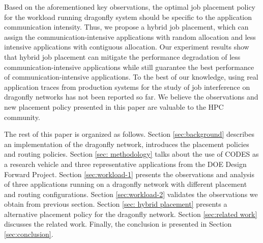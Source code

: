 Based on the aforementioned key observations, the optimal job placement policy for the workload running dragonfly system should be specific to the application communication intensity. Thus, we propose a hybrid job placement, which can assign the communication-intensive applications with random allocation and less intensive applications with contiguous allocation. Our experiment results show that hybrid job placement can mitigate the performance degradation of less communication-intensive applications while still guarantee the best performance of communication-intensive applications.
To the best of our knowledge, using real application traces from production systems for the study of job interference on dragonfly networks has not been reported so far. We believe the observations and new placement policy presented in this paper are valuable to the HPC community.


The rest of this paper is organized as follows. Section \ref{sec:background} describes an implementation of the dragonfly network, introduces the placement policies and routing policies. Section \ref{sec: methodology} talks about the use of CODES as a research vehicle and three representative applications from the DOE Design Forward Project. Section \ref{sec:workload-1} presents the observations and analysis of three applications running on a dragonfly network with different placement and routing configurations. Section \ref{sec:workload-2} validates the observations we obtain from previous section. Section \ref{sec: hybrid placement} presents a alternative placement policy for the dragonfly network. Section \ref{sec:related work} discusses the related work. Finally, the conclusion is presented in Section \ref{sec:conclusion}.


